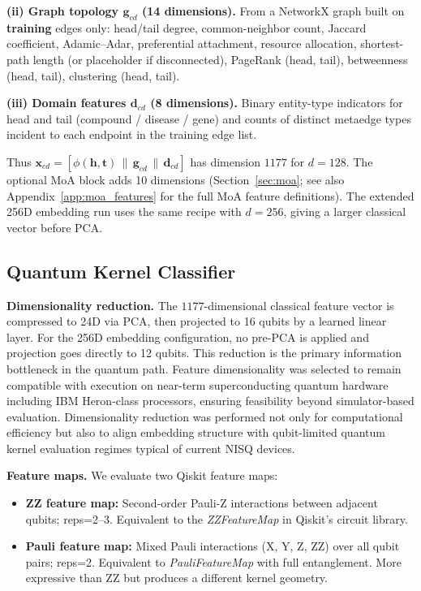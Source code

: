 \documentclass[10pt,twocolumn]{article}
\begin{document}
\textbf{(ii) Graph topology $\mathbf{g}_{cd}$ (14 dimensions).} From a NetworkX graph built on \textbf{training} edges only: head/tail degree, common-neighbor count, Jaccard coefficient, Adamic--Adar, preferential attachment, resource allocation, shortest-path length (or placeholder if disconnected), PageRank (head, tail), betweenness (head, tail), clustering (head, tail).

\textbf{(iii) Domain features $\mathbf{d}_{cd}$ (8 dimensions).} Binary entity-type indicators for head and tail (compound / disease / gene) and counts of distinct metaedge types incident to each endpoint in the training edge list.

Thus $\mathbf{x}_{cd} = [\phi(\mathbf{h},\mathbf{t})\,\|\,\mathbf{g}_{cd}\,\|\,\mathbf{d}_{cd}]$ has dimension $1177$ for $d{=}128$. The optional MoA block adds 10 dimensions (Section~\ref{sec:moa}; see also Appendix~\ref{app:moa_features} for the full MoA feature definitions). The extended 256D embedding run uses the same recipe with $d{=}256$, giving a larger classical vector before PCA.

\subsection{Quantum Kernel Classifier}

\textbf{Dimensionality reduction.} The $1177$-dimensional classical feature vector is compressed to 24D via PCA, then projected to 16 qubits by a learned linear layer. For the 256D embedding configuration, no pre-PCA is applied and projection goes directly to 12 qubits. This reduction is the primary information bottleneck in the quantum path. Feature dimensionality was selected to remain compatible with execution on near-term superconducting quantum hardware including IBM Heron-class processors, ensuring feasibility beyond simulator-based evaluation. Dimensionality reduction was performed not only for computational efficiency but also to align embedding structure with qubit-limited quantum kernel evaluation regimes typical of current NISQ devices.

\textbf{Feature maps.} We evaluate two Qiskit \cite{qiskit2023} feature maps:
\begin{itemize}[leftmargin=*]
\item \textbf{ZZ feature map:} Second-order Pauli-Z interactions between adjacent qubits; reps=2--3. Equivalent to the \textit{ZZFeatureMap} in Qiskit's circuit library.
\item \textbf{Pauli feature map:} Mixed Pauli interactions (X, Y, Z, ZZ) over all qubit pairs; reps=2. Equivalent to \textit{PauliFeatureMap} with full entanglement. More expressive than ZZ but produces a different kernel geometry.
\end{itemize}
\end{document}
